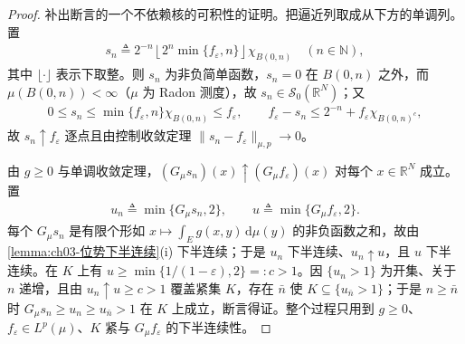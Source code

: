 \documentclass[../../main.tex]{subfiles}%
\begin{document}
\begin{proof}
补出断言的一个不依赖核的可积性的证明。把逼近列取成从下方的单调列。置
\begin{align*}
s_n\triangleq2^{-n}\left\lfloor2^n\min\{f_\varepsilon,n\}\right\rfloor\chi_{B(0,n)}\quad(n\in\mathbb{N}),
\end{align*}
其中 $\lfloor\cdot\rfloor$ 表示下取整。则 $s_n$ 为非负简单函数，$s_n=0$ 在 $B(0,n)$ 之外，而 $\mu(B(0,n))<\infty$（$\mu$ 为 Radon 测度），故 $s_n\in\mathscr S_0(\mathbb{R}^N)$；又
\begin{align*}
0\leqslant s_n\leqslant\min\{f_\varepsilon,n\}\chi_{B(0,n)}\leqslant f_\varepsilon,\qquad
f_\varepsilon-s_n\leqslant2^{-n}+f_\varepsilon\chi_{B(0,n)^c},
\end{align*}
故 $s_n\uparrow f_\varepsilon$ 逐点且由控制收敛定理 $\|s_n-f_\varepsilon\|_{\mu,p}\to0$。

由 $g\geqslant0$ 与单调收敛定理，$(G_\mu s_n)(x)\uparrow(G_\mu f_\varepsilon)(x)$ 对每个 $x\in\mathbb{R}^N$ 成立。置
\begin{align*}
u_n\triangleq\min\{G_\mu s_n,2\},\qquad u\triangleq\min\{G_\mu f_\varepsilon,2\}.
\end{align*}
每个 $G_\mu s_n$ 是有限个形如 $x\mapsto\int_{E}g(x,y)\,\mathrm{d}\mu(y)$ 的非负函数之和，故由\cref{lemma:ch03-位势下半连续}(i) 下半连续；于是 $u_n$ 下半连续、$u_n\uparrow u$，且 $u$ 下半连续。在 $K$ 上有 $u\geqslant\min\{1/(1-\varepsilon),2\}=:c>1$。因 $\{u_n>1\}$ 为开集、关于 $n$ 递增，且由 $u_n\uparrow u\geqslant c>1$ 覆盖紧集 $K$，存在 $\bar n$ 使 $K\subseteq\{u_{\bar n}>1\}$；于是 $n\geqslant\bar n$ 时 $G_\mu s_n\geqslant u_n\geqslant u_{\bar n}>1$ 在 $K$ 上成立，断言得证。整个过程只用到 $g\geqslant0$、$f_\varepsilon\in L^p(\mu)$、$K$ 紧与 $G_\mu f_\varepsilon$ 的下半连续性。
\end{proof}
\end{document}

